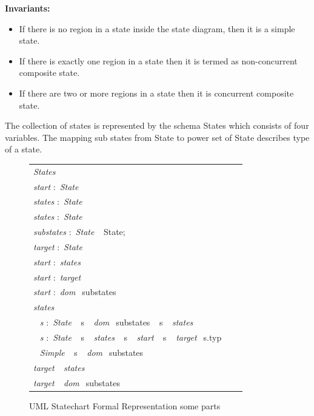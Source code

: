 \textbf{Invariants:}
\begin{itemize}
\item  If there is no region in a state inside the state diagram, then it is a simple state.
\item  If there is exactly one region in a state then it is termed as non-concurrent composite state.
\item  If there are two or more regions in a state then it is
concurrent composite state.
\end{itemize}

The collection of states is represented by the schema
States which consists of four variables. The mapping
sub states from State to power set of State describes type
of a state.
 \begin{figure}[ht!]
 	\centering
 	\begin{tabular}{lll}
 		\footnotesize                       
 		\textit{States}          \\
 		\footnotesize                       
 		\textit{start}          
 		$:$  \textit{State}\\
 		
 		\textit{states}          
 		$:$  \textit{State}\\
 		
 		\textit{states}           
 		$:$  \textit{State}\\
 		\footnotesize
 		\textit{substates}            $:$         \textit{State} $\ \  $ {State};       \\   
 		\footnotesize
 		\textit{target}             $:$         \textit{State}    \\
 		 \footnotesize                       
 		 \textit{start}           
 		 $:$  \textit{states}\\
 		  \footnotesize                       
 		  \textit{start}          
 		  $:$ \textit{target}\\
 		   \footnotesize                       
 		   \textit{start}           
 		   $:$  \textit{dom} $\ \  ${substates}\\
 		   
 		   \footnotesize                       
 		   \textit{states}          \\ 		
 		$\ \  $ \textit{s}      $:$     \textit{State} $\ \  $ {s} $\ \  $ \textit{dom} $\ \  ${substates} $\ \  $ {s} $\ \  $ \textit{states}        \\ 
 		$\ \  $ \textit{s}      $:$     \textit{State} $\ \  $ {s} $\ \  $ \textit{states} $\ \  $ {s} $\ \  $ \textit{start} $\ \  $ {s} $\ \  $ \textit{target}$\ \  $ {s.typ}\\ 
 		$\ \  $ \textit{Simple} $\ \  $ {s} $\ \  $ \textit{dom} $\ \  ${substates}\\
 		\footnotesize                       
 		\textit{target}  $\ \  $ \textit{states}        \\ 
 		\footnotesize                       
 		\textit{target}  $\ \  $ \textit{dom} $\ \  ${substates}\\	
 	\end{tabular}
 	\caption{UML Statechart Formal Representation some parts}
 	\label{statechart_formal_representation_invariants}
 	\end{figure}


